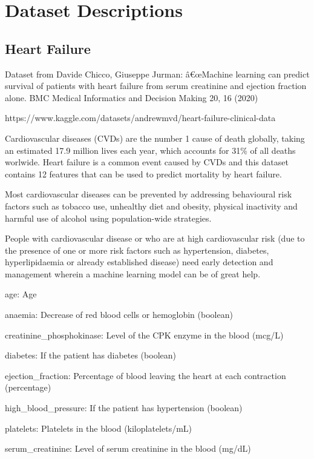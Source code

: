 \documentclass[
  letterpaper,
]{krantz}
\begin{document}
\chapter{Dataset Descriptions}\label{sec-data-descript}

\section{Heart Failure}\label{sec-dd-hear-failure}

Dataset from Davide Chicco, Giuseppe Jurman: â€œMachine learning can
predict survival of patients with heart failure from serum creatinine
and ejection fraction alone. BMC Medical Informatics and Decision Making
20, 16 (2020)

https://www.kaggle.com/datasets/andrewmvd/heart-failure-clinical-data

Cardiovascular diseases (CVDs) are the number 1 cause of death globally,
taking an estimated 17.9 million lives each year, which accounts for
31\% of all deaths worlwide. Heart failure is a common event caused by
CVDs and this dataset contains 12 features that can be used to predict
mortality by heart failure.

Most cardiovascular diseases can be prevented by addressing behavioural
risk factors such as tobacco use, unhealthy diet and obesity, physical
inactivity and harmful use of alcohol using population-wide strategies.

People with cardiovascular disease or who are at high cardiovascular
risk (due to the presence of one or more risk factors such as
hypertension, diabetes, hyperlipidaemia or already established disease)
need early detection and management wherein a machine learning model can
be of great help.

age: Age

anaemia: Decrease of red blood cells or hemoglobin (boolean)

creatinine\_phosphokinase: Level of the CPK enzyme in the blood (mcg/L)

diabetes: If the patient has diabetes (boolean)

ejection\_fraction: Percentage of blood leaving the heart at each
contraction (percentage)

high\_blood\_pressure: If the patient has hypertension (boolean)

platelets: Platelets in the blood (kiloplatelets/mL)

serum\_creatinine: Level of serum creatinine in the blood (mg/dL)
\end{document}
